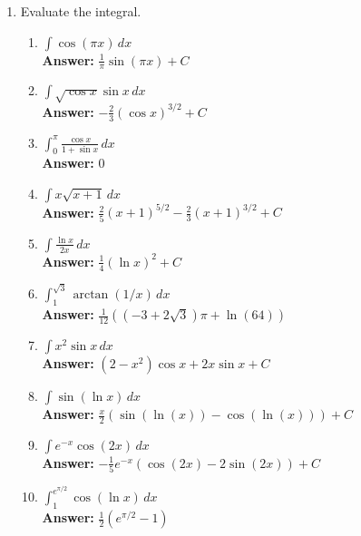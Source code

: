 \documentclass[letterpaper]{article}
\begin{document}
\begin{enumerate}

\item Evaluate the integral.
	\begin{enumerate}

	\item $\int \cos (\pi x) \,dx$
	\\ \textbf{Answer:} $\frac1\pi \sin(\pi x) +C$

	\item $\int \sqrt{\cos x}\sin x\, dx$
	\\ \textbf{Answer:} $-\frac23 (\cos x)^{3/2}+C$

	\item $\int_0^\pi \frac{\cos x}{1+\sin x}\,dx$ 
	\\ \textbf{Answer:} $0$

	\item $\int x \sqrt{x+1}\, dx$
	\\ \textbf{Answer:} $\frac25 (x+1)^{5/2}-\frac23(x+1)^{3/2} +C$

	\item $\int \frac{\ln x}{2x}\, dx$
	\\ \textbf{Answer:} $\frac14(\ln x)^2+C$

	\item $\int_1^{\sqrt{3}} \arctan(1/x)\,dx$
	\\ \textbf{Answer:} $\frac{1}{12} \left(\left(-3+2 \sqrt{3}\right) \pi +\ln(64)\right)$

	\item $\int x^2\sin x\,dx$
	\\ \textbf{Answer:} $(2-x^2)\cos x + 2x\sin x +C$

	\item $\int \sin(\ln x)\, dx$
	\\ \textbf{Answer:} $\frac x2 \left(\sin(\ln(x))-\cos(\ln(x))\right)+C$

	\item $\int e^{-x} \cos(2x)\, dx$
	\\ \textbf{Answer:} $-\frac15 e^{-x}(\cos (2x)-2\sin(2x))+C$

	\item $\int_1^{e^{\pi/2}} \cos (\ln x)\,dx$
	\\ \textbf{Answer:} $\frac12 (e^{\pi/2}-1)$


\end{enumerate}
\end{enumerate}
\end{document}
